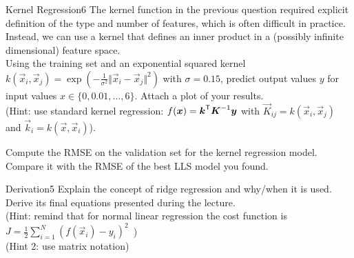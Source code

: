 \begin{questions}
\begin{question}{Kernel Regression}{6}
		The kernel function in the previous question required explicit definition of the type and number of features, which is often difficult in practice. Instead, we can use a kernel that defines an inner product in a (possibly infinite dimensional) feature space. \\
		Using the training set and an exponential squared kernel 		$k( \vec{x}_{i} , \vec{x}_{j} )= \exp ( -\frac{1}{\sigma^{2}} \Vert \vec{x}_{i}-\vec{x}_{j}\Vert ^{2} )$ with $\sigma=0.15$, predict output values $y$ for input values $x\in\{0,0.01,\ldots,6\}$. Attach a plot of your results.
		\\
		(Hint: use standard kernel regression: $f(\mbox{\ensuremath{{\boldsymbol{x}}}})={\boldsymbol{k}}^\mathsf{T}{\boldsymbol{K}}^{-1}{\boldsymbol{y}}$ with $\vec{K}_{ij}=k(\vec{x}_{i},\vec{x}_{j})$ and $\vec{k}_{i}=k(\vec{x},\vec{x}_{i})$).
		
		Compute the RMSE on the validation set for the kernel regression model. Compare it with the RMSE of the best LLS model you found.
		
\begin{answer}
\end{answer}
	\end{question}
	
	
	
	\begin{question}[bonus]{Derivation}{5}
		Explain the concept of ridge regression and why/when it is used.
		Derive its final equations presented during the lecture.\\
		(Hint: remind that for normal linear regression the cost function is $J = \frac{1}{2}\sum_{i=1}^N ( f(\vec x_i) - y_i ) ^2 \,$ )\\
		(Hint 2: use matrix notation)
		
\begin{answer}
\end{answer}
	\end{question}	
	
\end{questions}

